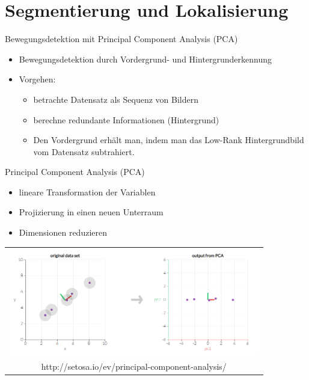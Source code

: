 \section{Segmentierung und Lokalisierung}
\begin{frame}[t,fragile]{Bewegungsdetektion mit Principal Component Analysis (PCA) }
	\begin{itemize}
  \item Bewegungsdetektion durch Vordergrund- und Hintergrunderkennung

  \item{Vorgehen:}
      \begin{itemize}
        \item{betrachte Datensatz als Sequenz von Bildern}
        \item{berechne redundante Informationen (Hintergrund)}
        \item{Den Vordergrund erhält man, indem man das Low-Rank Hintergrundbild vom Datensatz subtrahiert.}
      \end{itemize}

  \end{itemize}
\end{frame}

\begin{frame}[t,fragile]{Principal Component Analysis (PCA) }
      \begin{itemize}
        \item{lineare Transformation der Variablen}
        \item{Projizierung in einen neuen Unterraum}
        \item{Dimensionen reduzieren}
      
      \end{itemize}
       
  \vspace{0.01em}
  {
\begin{table}
\centering
        \begin{tabular}{c}
        \includegraphics[width=11cm]{img/Segmentierung/PCA}\\
      \tiny{http://setosa.io/ev/principal-component-analysis/}
         \end{tabular}
        
\end{table}
 }
\end{frame}


